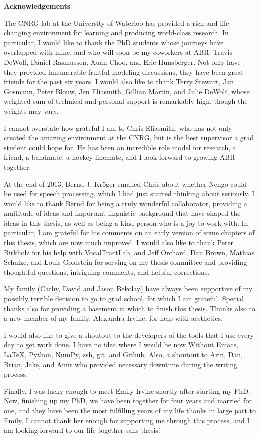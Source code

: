 \begin{center}\textbf{Acknowledgements}\end{center}

The CNRG lab at the University of Waterloo
has provided a rich and life-changing
environment for learning and
producing world-class research.
In particular, I would like to thank
the PhD students whose journeys
have overlapped with mine,
and who will soon be my coworkers at ABR:
Travis DeWolf, Daniel Rasmussen, Xuan Choo,
and Eric Hunsberger.
Not only have they provided
innumerable fruitful modeling discussions,
they have been great friends
for the past six years.
I would also like to thank
Terry Stewart, Jan Gosmann, Peter Blouw,
Jen Eliasmith, Gillian Martin,
and Julie DeWolf,
whose weighted sum of
technical and personal support
is remarkably high,
though the weights may vary.

I cannot overstate how grateful I am
to Chris Eliasmith,
who has not only
created the amazing environment
at the CNRG,
but is the best supervisor
a grad student could hope for.
He has been an incredible
role model for research,
a friend, a bandmate,
a hockey linemate,
and I look forward
to growing ABR together.

At the end of 2013,
Bernd J. Kr\"{o}ger emailed Chris
about whether Nengo could be used
for speech processing,
which I had just started
thinking about seriously.
I would like to thank Bernd
for being a truly wonderful collaborator,
providing a multitude of ideas
and important linguistic background
that have shaped the ideas in this thesis,
as well as being a kind person
who is a joy to work with.
In particular, I am grateful for
his comments on an early version of
some chapters of this thesis,
which are now much improved.
I would also like to thank Peter Birkholz
for his help with VocalTractLab,
and Jeff Orchard, Dan Brown,
Mathias Schulze, and Louis Goldstein
for serving on my thesis committee
and providing thoughtful questions,
intriguing comments, and helpful corrections.

My family (Cathy, David and Jason Bekolay)
have always been supportive
of my possibly terrible decision to go to grad school,
for which I am grateful.
Special thanks also for providing
a basement in which to finish this thesis.
Thanks also to a new member of my family,
Alexandra Irvine,
for help with aesthetics.

I would also like to give a shoutout
to the developers of the tools
that I use every day to get work done.
I have no idea where I would be now
Without Emacs, \LaTeX, Python,
NumPy, zsh, git, and Github.
Also, a shoutout to Arin, Dan,
Brian, Jake, and Amir
who provided necessary downtime
during the writing process.

Finally, I was lucky enough to
meet Emily Irvine shortly after starting my PhD.
Now, finishing up my PhD,
we have been together for four years
and married for one,
and they have been the most fulfilling
years of my life
thanks in large part to Emily.
I cannot thank her enough for
supporting me through this process,
and I am looking forward
to our life together sans thesis!

\cleardoublepage
